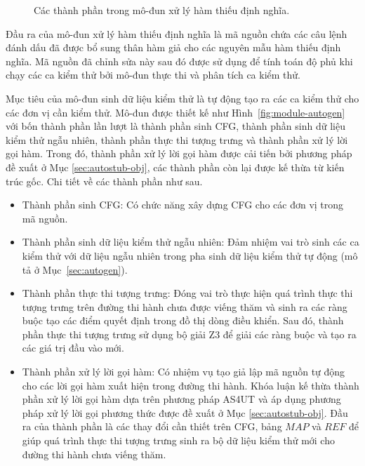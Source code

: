 \begin{figure}[h]
    \centering
    
    \caption{Các thành phần trong mô-đun xử lý hàm thiếu định nghĩa.}
    \label{fig:module-undef}
\end{figure}

Đầu ra của mô-đun xử lý hàm thiếu định nghĩa là mã nguồn chứa các câu lệnh đánh dấu đã được bổ sung thân hàm giả cho các nguyên mẫu hàm thiếu định nghĩa. Mã nguồn đã chỉnh sửa này sau đó được sử dụng để tính toán độ phủ khi chạy các ca kiểm thử bởi mô-đun thực thi và phân tích ca kiểm thử.

Mục tiêu của mô-đun sinh dữ liệu kiểm thử là tự động tạo ra các ca kiểm thử cho các đơn vị cần kiểm thử. Mô-đun được thiết kế như Hình~\ref{fig:module-autogen} với bốn thành phần lần lượt là thành phần sinh CFG, thành phần sinh dữ liệu kiểm thử ngẫu nhiên, thành phần thực thi tượng trưng và thành phần xử lý lời gọi hàm. Trong đó, thành phần xử lý lời gọi hàm được cải tiến bởi phương pháp đề xuất ở Mục \ref{sec:autostub-obj}, các thành phần còn lại được kế thừa từ kiến trúc gốc. Chi tiết về các thành phần như sau.
\begin{itemize}
    \item Thành phần sinh CFG: Có chức năng xây dựng CFG cho các đơn vị trong mã nguồn.
    \item Thành phần sinh dữ liệu kiểm thử ngẫu nhiên: Đảm nhiệm vai trò sinh các ca kiểm thử với dữ liệu ngẫu nhiên trong pha sinh dữ liệu kiểm thử tự động (mô tả ở Mục~\ref{sec:autogen}). 
    \item Thành phần thực thi tượng trưng: Đóng vai trò thực hiện quá trình thực thi tượng trưng trên đường thi hành chưa được viếng thăm và sinh ra các ràng buộc tạo các điểm quyết định trong đồ thị dòng điều khiển. Sau đó, thành phần thực thi tượng trưng sử dụng bộ giải Z3 để giải các ràng buộc và tạo ra các giá trị đầu vào mới.
    \item Thành phần xử lý lời gọi hàm: Có nhiệm vụ tạo giả lập mã nguồn tự động cho các lời gọi hàm xuất hiện trong đường thi hành. Khóa luận kế thừa thành phần xử lý lời gọi hàm dựa trên phương pháp AS4UT và áp dụng phương pháp xử lý lời gọi phương thức được đề xuất ở Mục \ref{sec:autostub-obj}. Đầu ra của thành phần là các thay đổi cần thiết trên CFG, bảng $MAP$ và $REF$ để giúp quá trình thực thi tượng trưng sinh ra bộ dữ liệu kiểm thử mới cho đường thi hành chưa viếng thăm.
\end{itemize}

